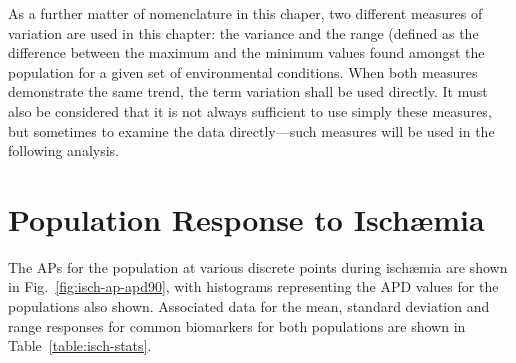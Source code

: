\documentclass[../thesis-main.tex]{subfiles}
\begin{document}
As a further matter of nomenclature in this chaper, two different measures of variation are used in this chapter: the variance and the range (defined as the difference between the maximum and the minimum values found amongst the population for a given set of environmental conditions. When both measures demonstrate the same trend, the term variation shall be used directly. It must also be considered that it is not always sufficient to use simply these measures, but sometimes to examine the data directly---such measures will be used in the following analysis.

\section{Population Response to Isch\ae{}mia}
\label{sec:isch-population}
The APs for the population at various discrete points during isch\ae{}mia are shown in Fig.~\ref{fig:isch-ap-apd90}, with histograms representing the APD values for the populations also shown. Associated data for the mean, standard deviation and range responses for common biomarkers for both populations are shown in Table~\ref{table:isch-stats}.
\end{document}
